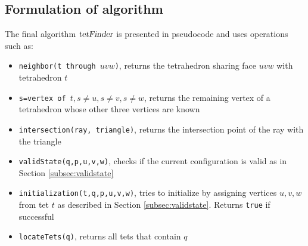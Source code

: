 \documentclass[../thesis.tex]{subfiles}
\begin{document}
\subsection{Formulation of algorithm}\label{subsec:tetfinder}
The final algorithm $\textsl{tetFinder}$ is presented in pseudocode and uses operations such as:
\begin{itemize}
  \item \texttt{neighbor(t through $uvw$)}, returns the tetrahedron sharing face $uvw$ with tetrahedron $t$
  \item \texttt{s=vertex of $t, s \neq u, s \neq v, s \neq w$}, returns the remaining vertex of a tetrahedron whose other three
  vertices are known
  \item \texttt{intersection(ray, triangle)}, returns the intersection point of the ray with the triangle %
  \item \texttt{validState(q,p,u,v,w)}, checks if the current configuration is valid as in Section \ref{subsec:validstate}
  \item \texttt{initialization(t,q,p,u,v,w)}, tries to initialize by assigning vertices $u,v,w$ from tet $t$ as described in Section \ref{subsec:validstate}. Returns \texttt{true} if successful
  \item \texttt{locateTets(q)}, returns all tets that contain $q$
\end{itemize}
\end{document}
